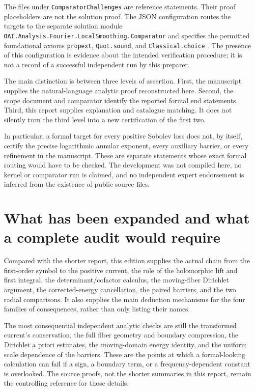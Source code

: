 \documentclass[11pt,a4paper]{article}
\numberwithin{equation}{section}
\theoremstyle{definition}
\theoremstyle{remark}
\begin{document}
The files under \texttt{ComparatorChallenges} are reference statements. Their
proof placeholders are not the solution proof. The JSON configuration routes
the targets to the separate solution module
\texttt{OAI.Analysis.Fourier.LocalSmoothing.Comparator} and specifies the
permitted foundational axioms \texttt{propext}, \texttt{Quot.sound}, and
\texttt{Classical.choice} \cite{challenge,config,solution}.
The presence of this configuration is evidence about the intended verification
procedure; it is not a record of a successful independent run by this preparer.

The main distinction is between three levels of assertion. First, the
manuscript supplies the natural-language analytic proof reconstructed here.
Second, the scope document and comparator identify the reported formal end
statements. Third, this report supplies explanation and catalogue matching.
It does not silently turn the third level into a new certification of the
first two.

In particular, a formal target for every positive Sobolev loss does not, by
itself, certify the precise logarithmic annular exponent, every auxiliary
barrier, or every refinement in the manuscript. These are separate statements
whose exact formal routing would have to be checked. The development was not
compiled here, no kernel or comparator run is claimed, and no independent
expert endorsement is inferred from the existence of public source files.

\section{What has been expanded and what a complete audit would require}
\label{sec:audit}
Compared with the shorter report, this edition supplies the actual chain from
the first-order symbol to the positive current, the role of the holomorphic
lift and first integral, the determinant/cofactor calculus, the moving-fiber
Dirichlet argument, the corrected-energy cancellation, the paired barriers,
and the two radial comparisons. It also supplies the main deduction mechanisms
for the four families of consequences, rather than only listing their names.

The most consequential independent analytic checks are still the transformed
current's conservation, the full fiber geometry and boundary compression,
the Dirichlet a priori estimates, the moving-domain energy identity, and the
uniform scale dependence of the barriers. These are the points at which a
formal-looking calculation can fail if a sign, a boundary term, or a
frequency-dependent constant is overlooked. The source proofs, not the shorter
summaries in this report, remain the controlling reference for those details.
\end{document}

